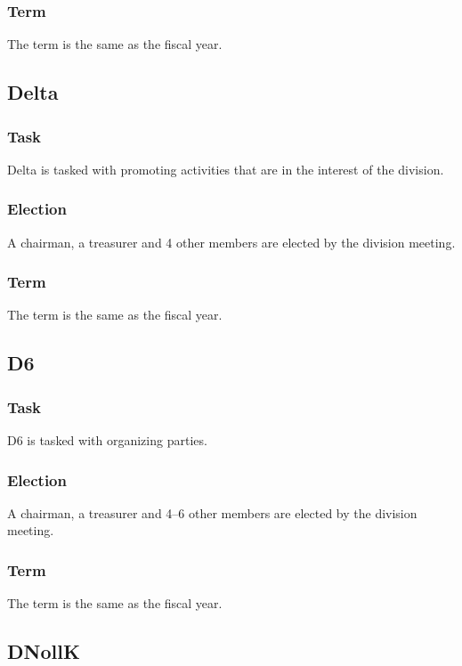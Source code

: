 \subsubsection{Term}
The term is the same as the fiscal year. 

\subsection{Delta}

\subsubsection{Task}
Delta is tasked with promoting activities that are in the interest of the division. 

\subsubsection{Election}
A chairman, a treasurer and 4 other members are elected by the division meeting. 

\subsubsection{Term}
The term is the same as the fiscal year. 

\subsection{D6}

\subsubsection{Task}
D6 is tasked with organizing parties. 


\subsubsection{Election}
A chairman, a treasurer and 4--6 other members are elected by the division meeting. 

\subsubsection{Term}
The term is the same as the fiscal year. 

\subsection{DNollK}

